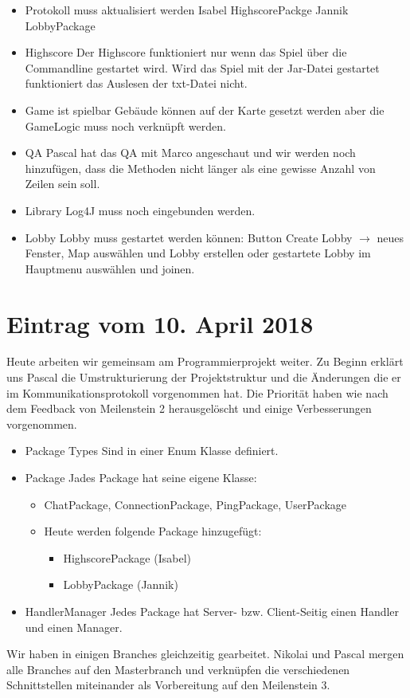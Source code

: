 \documentclass{scrartcl}
\newcommand{\n}{\newline}
\begin{document}
\begin{itemize}
	\item  Protokoll muss aktualisiert werden\n
	Isabel HighscorePackge\n
	Jannik LobbyPackage
	\item Highscore \n
	Der Highscore funktioniert nur wenn das Spiel über die Commandline gestartet wird. Wird das Spiel mit der Jar-Datei gestartet funktioniert das Auslesen der txt-Datei nicht. 
	\item Game ist spielbar \n
	Gebäude können auf der Karte gesetzt werden aber die GameLogic muss noch verknüpft werden. 
	\item QA \n
	Pascal hat das QA mit Marco angeschaut und wir werden noch hinzufügen, dass die Methoden nicht länger als eine gewisse Anzahl von Zeilen sein soll. 
	\item Library \n
	Log4J muss noch eingebunden werden. 
	\item Lobby \n
	Lobby muss gestartet werden können:\n
	Button Create Lobby $\rightarrow$ neues Fenster, Map auswählen und Lobby erstellen oder gestartete Lobby im Hauptmenu auswählen und joinen.
	
\end{itemize}

\section*{Eintrag vom 10. April 2018}
Heute arbeiten wir gemeinsam am Programmierprojekt weiter. Zu Beginn erklärt uns Pascal die Umstrukturierung der Projektstruktur und die Änderungen die er im Kommunikationsprotokoll vorgenommen hat. Die Priorität haben wie nach dem Feedback von Meilenstein 2 herausgelöscht und einige Verbesserungen vorgenommen. 

\begin{itemize}
	\item Package Types \n
	Sind in einer Enum Klasse definiert.
	\item Package \n
	Jades Package hat seine eigene Klasse:
	\begin{itemize}
		\item ChatPackage, ConnectionPackage, PingPackage, UserPackage
		\item Heute werden folgende Package hinzugefügt:
		\begin{itemize}
			\item HighscorePackage (Isabel)
			\item LobbyPackage (Jannik)
		\end{itemize}
	\end{itemize}
	\item Handler\/Manager \n
	Jedes Package hat Server- bzw. Client-Seitig einen Handler und einen Manager. 
\end{itemize}
Wir haben in einigen Branches gleichzeitig gearbeitet. Nikolai und Pascal mergen alle Branches auf den Masterbranch und verknüpfen die verschiedenen Schnittstellen miteinander als Vorbereitung auf den Meilenstein 3.
\end{document}
